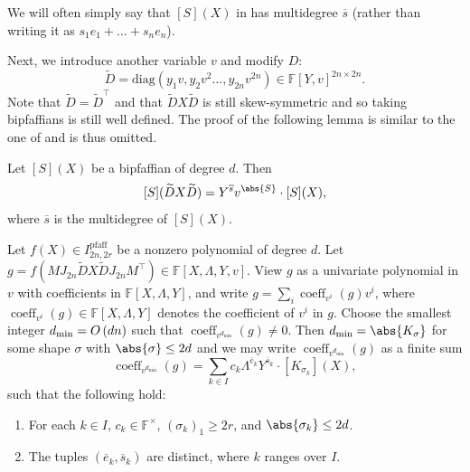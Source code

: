 \documentclass[10pt,a4paper]{amsart}
\DeclareMathOperator{\pfaff}{pfaff}
\DeclareMathOperator{\coeff}{coeff}
\newcommand*\F{\mathbb{F}}
\newcommand*\bigO[1]{%
    O\kern-0.0pt\left(#1\right)
}
\begin{document}
We will often simply say that $[S](X)$ in  has multidegree $\overline{s}$ (rather than writing it as $s_1 e_1 + \dots + s_n e_n$).

Next, we introduce another variable $v$ and modify $D$:
\[
    \widetilde{D} = \mathrm{diag}(y_1 v, y_2 v^2\dots,y_{2n} v^{2n} ) \in \F[Y,v]^{2n\times 2n}.
\]
Note that $\widetilde{D} = \widetilde{D}^\top$ and that $\widetilde{D} X \widetilde{D}$ is still skew-symmetric and so taking bipfaffians is still well defined.
The proof of the following lemma is similar to the one of  and is thus omitted.
\begin{lem}\label{lem:multiply-by-diag_pfaff}
Let $[S](X)$ be a bipfaffian of degree $d$.
Then 
\[
    [S](\widetilde{D} X \widetilde{D}) = Y^{\overline{s}}v^{\abs{S}} \cdot [S](X),
\]
where $\overline{s}$ is the multidegree of $[S](X)$.
\end{lem}

\begin{lem}\label{lem:key_pfaff}
Let $f(X) \in I^{\pfaff}_{2n, 2r}$ be a nonzero polynomial of degree $d$.
Let $g = f(M J_{2n} \widetilde{D} X \widetilde{D} J_{2n} M^\top) \in \F[X, \Lambda, Y, v]$.
View $g$ as a univariate polynomial in $v$ with coefficients in $\F[X, \Lambda, Y]$, and write $g=\sum_{i} \coeff_{v^i}(g) v^i$, where $\coeff_{v^i}(g)\in \F[X, \Lambda ,Y]$ denotes the coefficient of $v^i$ in $g$.
Choose the smallest integer $d_{\min} = \bigO{dn}$ such that  $\coeff_{v^{d_{\min}}}(g)\neq 0$.
Then $d_{\min} = \abs{K_\sigma}$ for some shape $\sigma$ with $\abs{\sigma}\leq 2d$ and we may write $\coeff_{v^{d_{\min}}}(g)$ as a finite sum
\[
    \coeff_{v^{d_{\min}}}(g) = \sum_{k\in I} c_k \Lambda^{\overline{e}_k} Y^{\overline{s}_k} \cdot [K_{\sigma_k}](X), 
\]
such that the following hold:
\begin{enumerate}
    \item\label{item:required1_pfaff} For each $k\in I$, $c_k\in\F^\times$,  $(\sigma_k)_1\geq 2r$, and $\abs{\sigma_k} \leq 2d$.
    \item\label{item:required2_pfaff} The tuples $(\overline{e}_k, \overline{s}_k)$ are distinct, where $k$ ranges over $I$.
\end{enumerate}
\end{lem}
\end{document}
